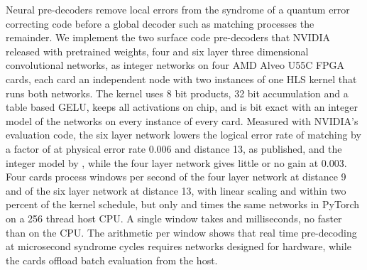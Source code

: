 Neural pre-decoders remove local errors from the syndrome of a quantum error correcting code before a global decoder
such as matching processes the remainder. We implement the two surface code pre-decoders that
NVIDIA released with pretrained weights, four and six layer three dimensional convolutional networks, as integer
networks on four AMD Alveo U55C FPGA cards, each card an independent node with two instances of one HLS kernel that
runs both networks. The kernel uses 8 bit products, 32 bit accumulation and a table based GELU, keeps all activations
on chip, and is bit exact with an integer model of the networks on every instance of every card. Measured with
NVIDIA's evaluation code, the six layer network lowers the logical error rate of matching by a factor of
\NumRatioAccFpThirteenHigh{} at physical error rate 0.006 and distance 13, as published, and the integer model by
\NumRatioAccIntThirteenHigh{}, while the four layer network gives little or no gain at
0.003. Four cards process \NumFourFast{} windows per second of the four layer network at distance 9 and
\NumFourAcc{} of the six layer network at distance 13, with linear scaling and within two percent of the kernel schedule,
but only \NumSpeedFast{} and \NumSpeedAcc{} times the same networks in PyTorch on
a 256 thread host CPU. A single window takes \NumLatFast{} and \NumLatAcc{} milliseconds, no faster than on the CPU. The arithmetic per window shows
that real time pre-decoding at microsecond syndrome cycles requires networks designed for hardware, while the cards
offload batch evaluation from the host.
